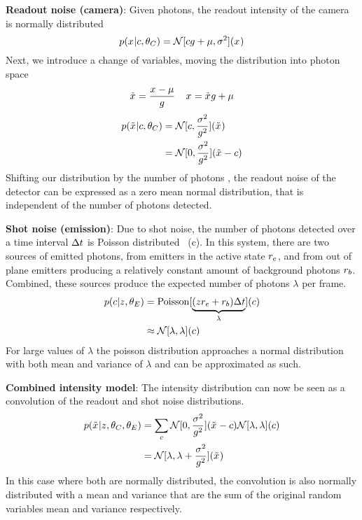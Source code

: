 \textbf{Readout noise (camera)}:
  Given \photons photons, the readout intensity of the camera is normally distributed
  \begin{equation}
    p(x_{}|c,\theta_C) = \mathcal{N}[cg + \mu, \sigma^2](x_{})
  \end{equation}
  Next, we introduce a change of variables, moving the distribution into photon space
  \begin{equation}
    \tilde{x}_{} = \frac{x_{} - \mu}{g}
    \;\;\;\;
    x_{} = \tilde{x}_{}g + \mu
  \end{equation}
  \begin{align}
    p(\tilde{x}_{}|c,\theta_C)
      &= \mathcal{N}[c, \frac{\sigma^2}{g^2}](\tilde{x}_{}) \\
      &= \mathcal{N}[0, \frac{\sigma^2}{g^2}](\tilde{x}_{} - c)
  \end{align}
  Shifting our distribution by the number of photons \photons, the readout noise of the detector can be expressed as a zero mean 
  normal distribution, that is independent of the number of photons detected.


\textbf{Shot noise (emission)}:
  Due to shot noise, the number of photons detected over a time interval $\Delta t$ is Poisson
  distributed~\cite{mehta_poisson_2016} (c). 
  In this system, there are two sources of emitted photons, from emitters in the active state $r_e$,
  and from out of plane emitters producing a relatively constant amount of background photons $r_b$. Combined, 
  these sources produce the expected number of photons $\lambda$ per frame.
  \begin{align}
    p(c|z_{},\theta_E)
      &= \operatorname{Poisson}[\underbrace{(z_{}r_e + r_b)\Delta t}_{\lambda}](c) \\
      &\approx \mathcal{N}[\lambda, \lambda](c)
  \end{align}
  For large values of $\lambda$ the poisson distribution approaches a normal distribution with both mean and 
  variance of $\lambda$ and can be approximated as such.

\textbf{Combined intensity model}:
The intensity distribution can now be seen as a convolution of the readout and shot noise distributions.
  \begin{align}
    p(\tilde{x}_{}|z_{},\theta_C, \theta_E)
      &= \sum_c
        \mathcal{N}[0, \frac{\sigma^2}{g^2}](\tilde{x}_{} - c)
        \mathcal{N}[\lambda, \lambda](c) \\
      &= \mathcal{N}[\lambda, \lambda + \frac{\sigma^2}{g^2}](\tilde{x}_{})
      \label{eq:method:approx_nomral}
  \end{align}
  In this case where both are normally distributed, the convolution is also normally distributed with 
  a mean and variance that are the sum of the original random variables mean and variance respectively. 

